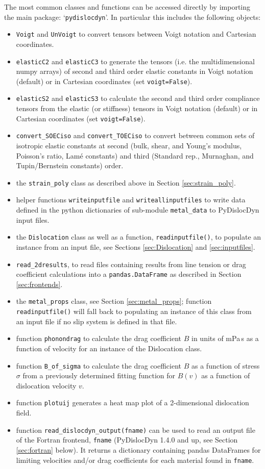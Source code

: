 \documentclass[11pt,letterpaper,oneside]{article}
\begin{document}
The most common classes and functions can be accessed directly by importing the main package: `\verb|pydislocdyn|'.
In particular this includes the following objects:
\begin{itemize}
	\item \verb|Voigt| and \verb|UnVoigt| to convert tensors between Voigt notation and Cartesian coordinates.
	\item \verb|elasticC2| and \verb|elasticC3| to generate the tensors (i.e. the multidimensional numpy arrays) of second and third order elastic constants in Voigt notation (default) or in Cartesian coordinates (set \verb|voigt=False|).
	\item \verb|elasticS2| and \verb|elasticS3| to calculate the second and third order compliance tensors from the elastic (or stiffness) tensors in Voigt notation (default) or in Cartesian coordinates (set \verb|voigt=False|).
	\item \verb|convert_SOECiso| and \verb|convert_TOECiso| to convert between common sets of isotropic elastic constants at second (bulk, shear, and Young's modulus, Poisson's ratio, Lam\'e constants) and third (Standard rep., Murnaghan, and Tupin/Bernstein constants) order.
	\item the \verb|strain_poly| class as described above in Section \ref{sec:strain_poly}.
   \item helper functions \verb|writeinputfile| and \verb|writeallinputfiles|  to write data defined in the python dictionaries of sub-module \verb|metal_data| to PyDislocDyn input files.
   \item  the \verb|Dislocation| class as well as a function, \verb|readinputfile()|, to populate an instance from an input file, see Sections \ref{sec:Dislocation} and \ref{sec:inputfiles}.
   \item \verb|read_2dresults|, to read files containing results from line tension or drag coefficient calculations into a \verb|pandas.DataFrame| as described in Section \ref{sec:frontends}.
   \item the \verb|metal_props| class, see Section \ref{sec:metal_props}; function \verb|readinputfile()| will fall back to populating an instance of this class from an input file if no slip system is defined in that file.
   \item function \verb|phonondrag| to calculate the drag coefficient $B$ in units of mPa\,s as a function of velocity for an instance of the Dislocation class.
   \item function \verb|B_of_sigma| to calculate the drag coefficient $B$ as a function of stress $\sigma$ from a previously determined fitting function for $B(v)$ as a function of dislocation velocity $v$.
   \item function \verb|plotuij| generates a heat map plot of a 2-dimensional dislocation field.
   \item function \verb|read_dislocdyn_output(fname)| can be used to read an output file of the Fortran frontend, \verb|fname| (PyDislocDyn 1.4.0 and up, see Section \ref{sec:fortran} below).
   It returns a dictionary containing pandas DataFrames for limiting velocities and/or drag coefficients for each material found in \verb|fname|.
\end{itemize}
\end{document}
